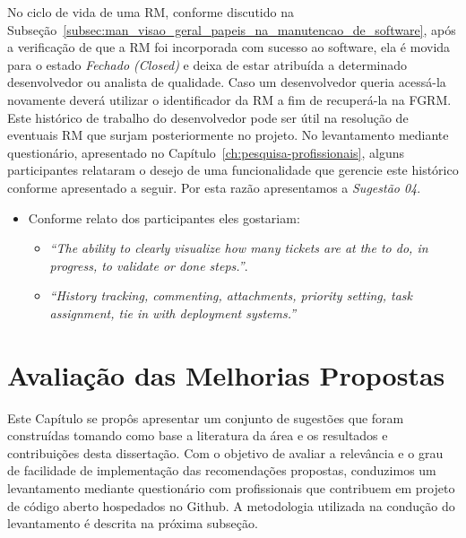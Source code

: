
No ciclo de vida de uma RM, conforme discutido na
Subseção~\ref{subsec:man_visao_geral_papeis_na_manutencao_de_software}, após a
verificação de que a RM foi incorporada com sucesso ao software, ela é movida
para o estado \textit{Fechado (Closed)} e deixa de estar atribuída a determinado
desenvolvedor ou analista de qualidade. Caso um desenvolvedor queria acessá-la
novamente deverá utilizar o identificador da RM a fim de recuperá-la na FGRM\@.
Este histórico de trabalho do desenvolvedor pode ser útil na resolução de
eventuais RM que surjam posteriormente no projeto. No levantamento mediante
questionário, apresentado no Capítulo~\ref{ch:pesquisa-profissionais}, alguns
participantes relataram o desejo de uma funcionalidade  que gerencie este
histórico conforme apresentado a seguir. Por esta razão apresentamos a
\textit{Sugestão 04}.

\begin{itemize}
	\item Conforme relato dos participantes eles gostariam:
	\begin{itemize}
		\item \textit{``The ability to clearly visualize how many tickets are at
				the to do, in progress, to validate or done steps.''}.
		\item \textit{``History tracking, commenting, attachments, priority
				setting, task assignment, tie in with deployment systems.''}
	\end{itemize}
\end{itemize}


\section{Avaliação das Melhorias Propostas}
\label{sec:sug_melhoria_avaliacao_das_melhorias}

Este Capítulo se propôs apresentar um conjunto de sugestões que foram
construídas tomando como base a literatura da área e os resultados e
contribuições desta dissertação. Com o objetivo de avaliar a relevância e o grau
de facilidade de implementação das recomendações propostas, conduzimos um
levantamento mediante questionário com profissionais que contribuem em projeto
de código aberto hospedados no Github. A metodologia utilizada na condução do
levantamento é descrita na próxima subseção.


